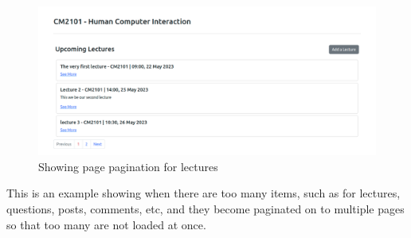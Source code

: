 \begin{figure}[H]
\centering
\includegraphics[scale=0.27]{images/application/64 - lectures.png}
\caption{Showing page pagination for lectures}
\label{fig:figure2}
\end{figure}

This is an example showing when there are too many items, such as for lectures, questions, posts, comments, etc, and they become paginated on to multiple pages so that too many are not loaded at once.


